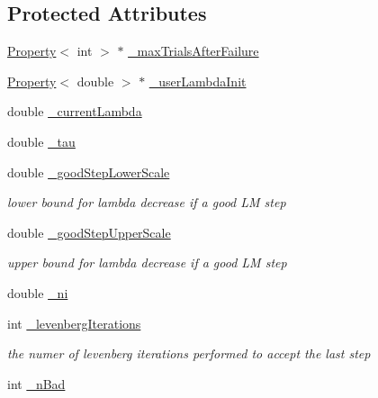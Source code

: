 \subsection*{Protected Attributes}
\begin{DoxyCompactItemize}
\item 
\hyperlink{classg2o_1_1Property}{Property}$<$ int $>$ $\ast$ \hyperlink{classg2o_1_1OptimizationAlgorithmLevenberg_a1f3b03bbcb2dbeed686069bed8783b80}{\+\_\+max\+Trials\+After\+Failure}
\item 
\hyperlink{classg2o_1_1Property}{Property}$<$ double $>$ $\ast$ \hyperlink{classg2o_1_1OptimizationAlgorithmLevenberg_a021c97d3f8205ec2ae7fde147f98b452}{\+\_\+user\+Lambda\+Init}
\item 
double \hyperlink{classg2o_1_1OptimizationAlgorithmLevenberg_aec7bba815e20361aa7ccc4661f90a034}{\+\_\+current\+Lambda}
\item 
double \hyperlink{classg2o_1_1OptimizationAlgorithmLevenberg_ac09602f23e52c5dbc6be1bf77e9f9d5f}{\+\_\+tau}
\item 
double \hyperlink{classg2o_1_1OptimizationAlgorithmLevenberg_a4951bc2e2fcca2c4eae4864690a4c087}{\+\_\+good\+Step\+Lower\+Scale}
\begin{DoxyCompactList}\small\item\em lower bound for lambda decrease if a good LM step \end{DoxyCompactList}\item 
double \hyperlink{classg2o_1_1OptimizationAlgorithmLevenberg_a16d8b5540cd7ae0c132a565e3f49c021}{\+\_\+good\+Step\+Upper\+Scale}
\begin{DoxyCompactList}\small\item\em upper bound for lambda decrease if a good LM step \end{DoxyCompactList}\item 
double \hyperlink{classg2o_1_1OptimizationAlgorithmLevenberg_a8bcb1a957056cba788072992c5a8a7a1}{\+\_\+ni}
\item 
int \hyperlink{classg2o_1_1OptimizationAlgorithmLevenberg_a2319771c8d3ee0f773bdb86d5416bab7}{\+\_\+levenberg\+Iterations}
\begin{DoxyCompactList}\small\item\em the numer of levenberg iterations performed to accept the last step \end{DoxyCompactList}\item 
int \hyperlink{classg2o_1_1OptimizationAlgorithmLevenberg_a7f0b375c45a9f91f2676548591273c8d}{\+\_\+n\+Bad}
\end{DoxyCompactItemize}
